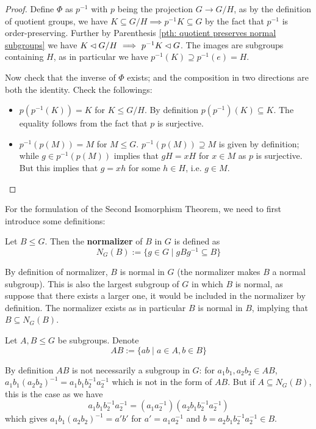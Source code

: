 \begin{proof}
    Define $\Phi$ as $p^{-1}$ with $p$ being the projection $G \to G/H$, as by the definition of quotient groups, we have $K \subseteq G/H \implies p^{-1}K \subseteq G$ by the fact that $p^{-1}$ is order-preserving. Further by Parenthesis \ref{pth: quotient preserves normal subgroups} we have $K \lhd G/H \ \Longrightarrow\  p^{-1}K \lhd G$. The images are subgroups containing $H$, as in particular we have $p^{-1}(K) \supseteq p^{-1}(e) = H$. 

    Now check that the inverse of $\Phi$ exists; and the composition in two directions are both the identity. Check the followings:
    \begin{itemize}
        \item $p(p^{-1}(K)) = K$ for $K \leq G/H$. By definition $p(p^{-1})(K) \subseteq K$. The equality follows from the fact that $p$ is surjective.
        \item $p^{-1}(p(M)) = M$ for $M \leq G$. $p^{-1}(p(M)) \supseteq M$ is given by definition; while $g \in p^{-1}(p(M))$ implies that $gH = xH$ for $x \in M$ as $p$ is surjective. But this implies that $g = xh$ for some $h \in H$, i.e. $g \in M$.
    \end{itemize}
\end{proof}

For the formulation of the Second Isomorphism Theorem, we need to first introduce some definitions:
\begin{definition}
    Let $B \leq G$. Then the \textbf{normalizer} of $B$ in $G$ is defined as
    \[
        N_G(B) := \{ g \in G \mid gBg^{-1} \subseteq B \}
    \]
\end{definition}

\begin{remark}
    By definition of normalizer, $B$ is normal in $G$ (the normalizer makes $B$ a normal subgroup). This is also the largest subgroup of $G$ in which $B$ is normal, as suppose that there exists a larger one, it would be included in the normalizer by definition. The normalizer exists as in particular $B$ is normal in $B$, implying that $B \subseteq N_G(B)$.
\end{remark}

\begin{notation}
    Let $A, B \leq G$ be subgroups. Denote
    \[
        AB := \{ ab \mid a \in A, b \in B \}
    \]
\end{notation}

\begin{remark}
    By definition $AB$ is not necessarily a subgroup in $G$: for $a_1b_1, a_2 b_2 \in AB$, $a_1 b_1(a_2 b_2)^{-1} = a_1 b_1 b_2^{-1} a_2^{-1}$ which is not in the form of $AB$. But if $A \subseteq N_G(B)$, this is the case as we have
    \[
        a_1 b_1 b_2^{-1} a_2^{-1} = (a_1 a_2^{-1}) (a_2 b_1 b_2^{-1} a_2^{-1})
    \]
    which gives $a_1 b_1 (a_2 b_2)^{-1} = a' b'$ for $a' = a_1 a_2^{-1}$ and $b = a_2 b_1 b_2^{-1} a_2^{-1} \in B$.
\end{remark}

